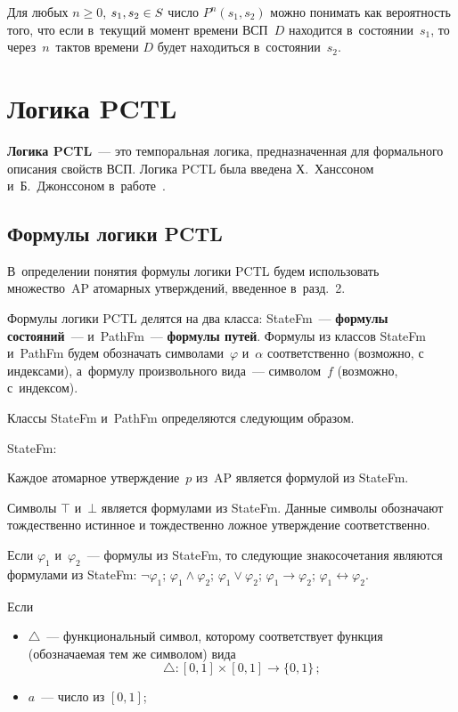 \begin{multicols}{2}
Для любых $n\geq 0$, $s_1, s_2\hm\in S$ число $P^n(s_1,s_2)$
можно понимать как вероятность того, что если в~текущий
момент времени ВСП~$D$ находится в~состоянии~$s_1$,
то через~$n$~тактов времени $D$ будет находиться
в~состоянии~$s_2$.
\en

\vspace*{-9pt}

\section{Логика PCTL}

{\bf Логика PCTL}~--- это темпоральная логика,
предназначенная для формального описания свойств ВСП.
Логика PCTL была введена Х.~Ханссоном  и~Б.~Джонссоном  в~работе~\cite{35}.


\subsection{Формулы логики PCTL}

В~определении понятия формулы логики PCTL
 будем использовать множество~AP атомарных утверждений, введенное в~разд.~2.

Формулы логики PCTL делятся на два класса: StateFm~--- {\bf формулы
состояний}~--- и~PathFm~--- {\bf формулы путей}. Формулы из классов
StateFm и~PathFm  будем обозначать символами~$\varphi$
и~$\alpha$ соответственно (возможно, с индексами), а~формулу
произвольного вида~--- символом~$f$ (возможно, с~индексом).

Классы StateFm и~PathFm определяются следующим образом.

\smallskip

StateFm:

\smallskip

\bn
\item Каждое атомарное утверждение~$p$ из~AP является формулой из
StateFm.
\item Символы $\top$ и~$\bot$ является формулами
из  StateFm. Данные символы обозначают тож\-дественно истинное
и тождественно ложное утверждение соответственно.
\item Если $\varphi_1$ и~$\varphi_2$~--- формулы
из StateFm, то  следующие знакосочетания являются формулами из StateFm:
$
\neg \varphi_1$; $\varphi_1\wedge \varphi_2$;
$\varphi_1\vee \varphi_2$;
$\varphi_1\to \varphi_2$;
$\varphi_1\leftrightarrow \varphi_2$.
\item Если
\begin{itemize}
\item $\triangle$~--- функциональный символ, которому соответствует функция
(обозначаемая тем же символом) вида
$$\triangle: [0,1]\times [0,1]\to \{0,1\}\,;
$$
  \item $a$~--- число из $[0,1]$;


\end{itemize}
\end{multicols}
